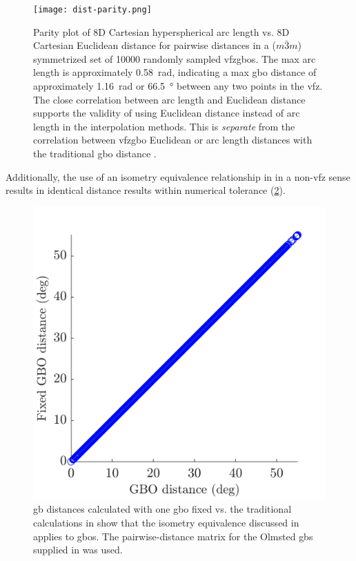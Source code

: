 \documentclass[preprint,12pt]{elsarticle}
\begin{document}
\begin{figure}
\centering
\texttt{[image: dist-parity.png]}
\caption{Parity plot of 8D Cartesian hyperspherical arc length vs. 8D Cartesian Euclidean distance for pairwise distances in a ($m\bar{3}m$) symmetrized set of \num{10000} randomly sampled \glspl{vfzgbo}. The max arc length is approximately \SI{0.58}{\radian}, indicating a max \gls{gbo} distance of approximately \SI{1.16}{\radian} or \SI{66.5}{\degree} between any two points in the \gls{vfz}. The close correlation between arc length and Euclidean distance supports the validity of using Euclidean distance instead of arc length in the interpolation methods. This is \textit{separate} from the correlation between \gls{vfzgbo} Euclidean or arc length distances with the traditional \gls{gbo} distance \cite{chesserLearningGrainBoundary2020}.}
\label{fig:dist-parity}
\end{figure}

Additionally, the use of an isometry equivalence relationship in \citet{morawiecDistancesGrainInterfaces2019} in a non-\gls{vfz} sense results in identical distance results within numerical tolerance (\cref{fig:pd-fix}).

\begin{figure}
    \centering
    \includegraphics{figures/pd-fix.png}
    \caption{\Gls{gb} distances calculated with one \gls{gbo} fixed vs. the traditional calculations in \citet{chesserLearningGrainBoundary2020} show that the isometry equivalence discussed in \citet{morawiecDistancesGrainInterfaces2019} applies to \glspl{gbo}. The pairwise-distance matrix for the Olmsted \glspl{gb} supplied in \cite{chesserGBOctonionCode2019} was used. }
    \label{fig:pd-fix}
\end{figure}
\end{document}
